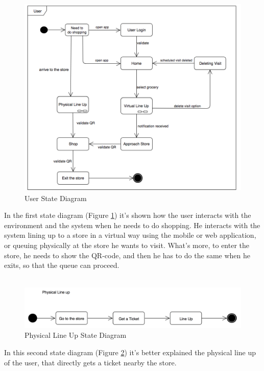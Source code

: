 \documentclass[]{article}
\begin{document}
		\begin{figure}[H]
			\centering
			\includegraphics[scale=0.5]{user.png}
			\caption{User State Diagram}
			\label{fig:state_diagram1}
		\end{figure}
		
		
		In the first state diagram (Figure \ref{fig:state_diagram1}) it’s shown how the user interacts with the environment and the system when he needs to do shopping. He interacts with the system lining up to a store in a virtual way using the mobile or web application, or queuing physically at the store he wants to visit.
What’s more, to enter the store, he needs to show the QR-code, and then he has to do the same when he exits, so that the queue can proceed. \\

		\textbf{}\\ \newpage

		\begin{figure}[H]
			\centering
			\includegraphics[width=\linewidth]{physicalqueue.png}
			\caption{Physical Line Up State Diagram}
			\label{fig:state_diagram2}
		\end{figure}
		
		
		In this second state diagram (Figure \ref{fig:state_diagram2})  it’s better explained the physical line up of the user, that directly gets a ticket nearby the store.\\
		
\end{document}
